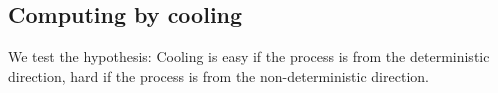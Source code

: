 \documentclass[twocolumn,superscriptaddress,english,showpacs,longbibliography]{revtex4-2}
\begin{document}





\subsection{Computing by cooling}\label{local-cooling}

We test the hypothesis: Cooling is easy if the process is from the
deterministic direction, hard if the process is from the
non-deterministic direction.
\end{document}
